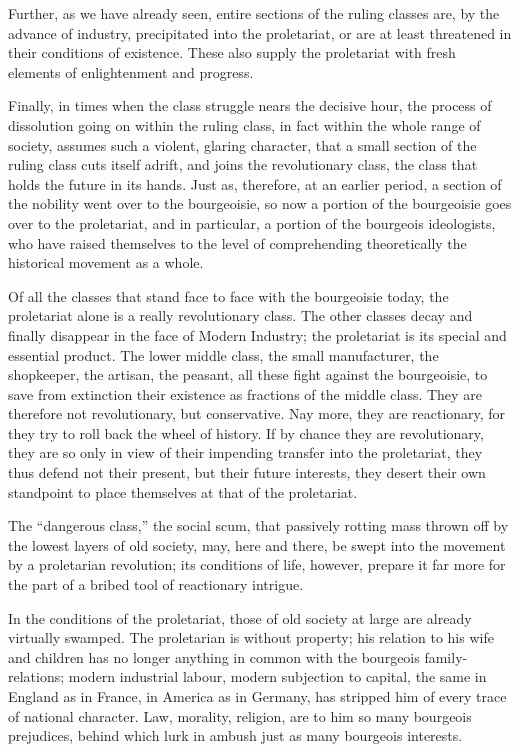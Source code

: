 Further, as we have already seen, entire sections of the ruling classes
are, by the advance of industry, precipitated into the proletariat, or
are at least threatened in their conditions of existence. These also
supply the proletariat with fresh elements of enlightenment and
progress.

Finally, in times when the class struggle nears the decisive hour, the
process of dissolution going on within the ruling class, in fact within
the whole range of society, assumes such a violent, glaring character,
that a small section of the ruling class cuts itself adrift, and joins
the revolutionary class, the class that holds the future in its hands.
Just as, therefore, at an earlier period, a section of the nobility
went over to the bourgeoisie, so now a portion of the bourgeoisie goes
over to the proletariat, and in particular, a portion of the bourgeois
ideologists, who have raised themselves to the level of comprehending
theoretically the historical movement as a whole.

Of all the classes that stand face to face with the bourgeoisie today,
the proletariat alone is a really revolutionary class. The other
classes decay and finally disappear in the face of Modern Industry; the
proletariat is its special and essential product. The lower middle
class, the small manufacturer, the shopkeeper, the artisan, the
peasant, all these fight against the bourgeoisie, to save from
extinction their existence as fractions of the middle class. They are
therefore not revolutionary, but conservative. Nay more, they are
reactionary, for they try to roll back the wheel of history. If by
chance they are revolutionary, they are so only in view of their
impending transfer into the proletariat, they thus defend not their
present, but their future interests, they desert their own standpoint
to place themselves at that of the proletariat.

The \enquote{dangerous class,} the social scum, that passively rotting mass
thrown off by the lowest layers of old society, may, here and there, be
swept into the movement by a proletarian revolution; its conditions of
life, however, prepare it far more for the part of a bribed tool of
reactionary intrigue.

In the conditions of the proletariat, those of old society at large are
already virtually swamped. The proletarian is without property; his
relation to his wife and children has no longer anything in common with
the bourgeois family-relations; modern industrial labour, modern
subjection to capital, the same in England as in France, in America as
in Germany, has stripped him of every trace of national character. Law,
morality, religion, are to him so many bourgeois prejudices, behind
which lurk in ambush just as many bourgeois interests.

